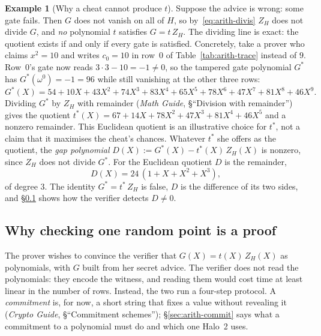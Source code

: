\documentclass[11pt,a4paper]{article}
\theoremstyle{definition}
\newtheorem{example}[theorem]{Example}
\newcommand{\ZH}{Z_H}
\begin{document}
\begin{example}[Why a cheat cannot produce $t$]\label{ex:arith-cheat}
Suppose the advice is wrong: some gate fails. Then $G$ does not vanish on
all of $H$, so by~\eqref{eq:arith-divis} $\ZH$ does not divide $G$, and
\emph{no} polynomial $t$ satisfies $G = t\,\ZH$. The dividing line is
exact: the quotient exists if and only if every gate is satisfied.
Concretely, take a prover who claims $x^2 = 10$ and writes $c_0 = 10$ in
row~$0$ of Table~\ref{tab:arith-trace} instead of $9$. Row~$0$'s gate now
reads $3 \cdot 3 - 10 = -1 \ne 0$, so the tampered gate polynomial
$G^{*}$ has $G^{*}(\omega^0) = -1 = 96$ while still vanishing at the other
three rows:
\[
G^{*}(X) = 54 + 10X + 43X^2 + 74X^3 + 83X^4 + 65X^5 + 78X^6 + 47X^7
           + 81X^8 + 46X^9 .
\]
Dividing $G^{*}$ by $\ZH$ with remainder (\emph{Math Guide}, \S``Division
with remainder'') gives the quotient
$t^{*}(X) = 67 + 14X + 78X^2 + 47X^3 + 81X^4 + 46X^5$ and a nonzero
remainder. This Euclidean quotient is an illustrative choice for
$t^{*}$, not a claim that it maximises the cheat's chances. Whatever
$t^{*}$ she offers as the quotient, the \emph{gap polynomial}
$D(X) := G^{*}(X) - t^{*}(X)\,\ZH(X)$ is nonzero, since $\ZH$ does not
divide $G^{*}$. For the Euclidean quotient $D$ is the remainder,
\begin{equation}\label{eq:arith-D}
D(X) = 24\,(1 + X + X^2 + X^3),
\end{equation}
of degree $3$. The identity $G^{*} = t^{*}\,\ZH$ is false, $D$ is the
difference of its two sides, and \S\ref{sec:arith-random} shows how the
verifier detects $D \ne 0$.
\end{example}

\subsection{Why checking one random point is a proof}
\label{sec:arith-random}

The prover wishes to convince the verifier that $G(X) = t(X)\,\ZH(X)$ as
polynomials, with $G$ built from her secret advice. The verifier does not
read the polynomials: they encode the witness, and reading them would cost
time at least linear in the number of rows. Instead, the two run a
four-step protocol. A \emph{commitment} is, for now, a short string that fixes a
value without revealing it (\emph{Crypto Guide}, \S``Commitment
schemes''); \S\ref{sec:arith-commit} says what a commitment to a
polynomial must do and which one Halo~2 uses.
\end{document}
